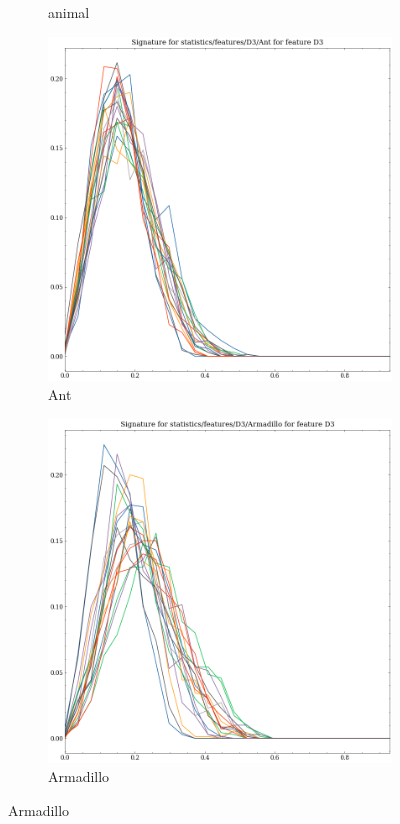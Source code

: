\begin{figure}[t!p]
\begin{subfigure}[b]{0.23\textwidth}
        \caption{animal}    
    \end{subfigure}
    \hfill
    \begin{subfigure}[b]{0.23\textwidth}
        \includegraphics[width=\textwidth]{assets/feature_extraction/D3/Ant.png}
        \caption{Ant}
    \end{subfigure}
    \hfill    
    \begin{subfigure}[b]{0.23\textwidth}
        \includegraphics[width=\textwidth]{assets/feature_extraction/D3/Armadillo.png}
        \caption{Armadillo}
    \end{subfigure}
    \hfill
    

\end{figure}

